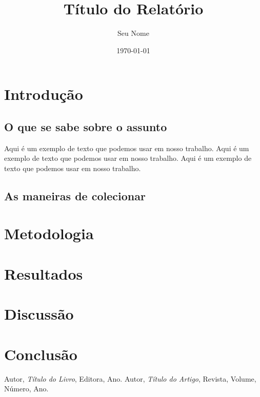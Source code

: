 \documentclass[a4paper,12pt]{report}
\title{Título do Relatório}
\author{Seu Nome}
\date{\today}
\begin{document}
\maketitle

\tableofcontents

\newpage

\chapter{Introdução}

\section{O que se sabe sobre  o assunto}
Aqui é um exemplo de texto que podemos usar em nosso trabalho. Aqui é um exemplo de texto que podemos usar em nosso trabalho. Aqui é um exemplo de texto que podemos usar em nosso trabalho. \cite{ref2}

\section{As maneiras de colecionar}
\lipsum[2-3]

\chapter{Metodologia}
\lipsum[4-5] \cite{ref1}

\chapter{Resultados}
\lipsum[6-7]

\chapter{Discussão}
\lipsum[8-9]

\chapter{Conclusão}
\lipsum[10]

\begin{thebibliography}{9}
     Autor, \textit{Título do Livro}, Editora, Ano.
     Autor, \textit{Título do Artigo}, Revista, Volume, Número, Ano.
\end{thebibliography}
\end{document}
